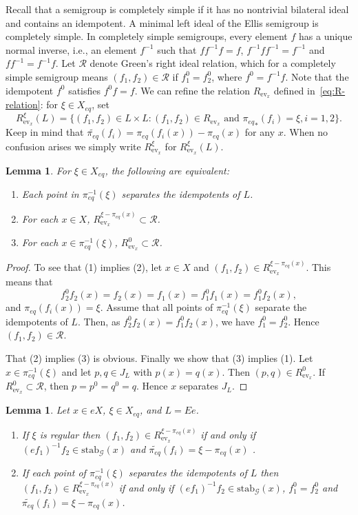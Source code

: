 \documentclass[12pt]{amsart}
\newtheorem{lemma}[theorem]{Lemma}
\theoremstyle{definition}
\numberwithin{equation}{section}
\newcommand{\tcb}{\textcolor{blue}}
\newcommand{\Gg}{{\mathcal G}}
\newcommand{\Rr}{{\mathcal R}}
\newcommand{\Xe}{X_{eq}}
\newcommand{\pe}{\pi_{eq}}
\newcommand{\fb}[1]{\pe^{-1}(#1)}
\newcommand{\tpe}{\widetilde{\pe}}
\newcommand{\ev}{\mathrm{ev}}
\newcommand{\stab}{\mathrm{stab}}
\begin{document}
 Recall that a semigroup is  completely simple  if it has no nontrivial bilateral ideal and contains an idempotent. A minimal left ideal of the Ellis semigroup is completely simple. In completely simple semigroups, every element $f$ has a unique normal inverse, i.e., an element $f^{-1}$ such that $ff^{-1}f = f$, $f^{-1}ff^{-1} = f^{-1}$ and $ff^{-1}=f^{-1}f$. 
Let $\Rr$ denote Green's right ideal relation, which for a completely simple semigroup means $(f_1,f_2)\in \Rr$ if $f_1^0 = f_2^0$, where 
$f^0 = f^{-1} f$. Note that the idempotent  $f^0$   satisfies $f^0f=f$. We can refine the relation $R_{\ev_x}$ defined in~\eqref{eq:R-relation}: for $\xi\in\Xe$, set
$$R^\xi_{\ev_x}(L)=\{(f_1,f_2)\in L\times L: (f_1,f_2)\in R_{\ev_x} \mbox{ and } {\pe}_* (f_i)= \xi, i=1,2\}.$$ 
Keep in mind that $\tpe (f_i)= \pe(f_i(x)) -\pe(x)$  for any $x$. 
When no confusion  arises we simply write $R^\xi_{\ev_x}$ for $R^\xi_{\ev_x}(L)$.
\begin{lemma}\label{lem-Rr} For $\xi\in\Xe$, the following are equivalent:
\begin{enumerate}
\item Each point in $\fb{\xi}$ separates the idempotents of $L$.
\item For each $x\in X$, $R^{\xi-\pe(x)}_{\ev_x}\subset \Rr$. 
\item For each $x\in \fb{\xi}$, $R^0_{\ev_x}\subset \Rr$. 
\end{enumerate}
\end{lemma}
\begin{proof} To see that (1) implies (2),  
let $x\in X$ and $(f_1,f_2)\in R^{\xi-\pe(x)}_{\ev_x}$. This means that \[f_2^0 f_2(x)= f_2(x)=f_1(x)=f_1^0 f_1(x) = f_1^0 f_2(x) , \] and $\pe(f_i(x))=\xi$. Assume that all points of $\fb{\xi}$ separate the idempotents of $L$. Then, as $f_2^0 f_2(x)=  f_1^0 f_2(x)$, we have $f_1^0 = f_2^0$. Hence $(f_1,f_2)\in\Rr$.

That (2) implies (3) is  obvious. 
Finally we show that (3) implies (1). Let  $x\in\fb{\xi}$ and 
let $p,q\in J_L$ with $p(x)=q(x)$. Then $(p,q)\in R^0_{\ev_x}$. If $R^0_{\ev_x}\subset \Rr$, then $p=p^0=q^0=q$. Hence $x$ separates $J_L$.
\end{proof}
\begin{lemma} \label{lem-sing}
Let $x\in eX$, $\xi\in \Xe$, and $L=Ee$.
\begin{enumerate}
\item If  $\xi$ is regular then
$(f_1,f_2)\in R^{\xi-\pe(x)}_{\ev_{x}}$ if and only if $(ef_1)^{-1}f_2 \in \stab_{\Gg}(x)$ and $\tpe(f_i) = \xi-\pe(x)$     . 
\item  
If each point of $\fb{\xi}$ separates the idempotents of $L$ then
$(f_1,f_2)\in R^{\xi-\pe(x)}_{\ev_{x}}$ if and only if $(ef_1)^{-1}f_2 \in \stab_{\Gg}(x)$, $f_1^0=f_2^0$ and $\tpe(f_i) = \xi-\pe(x)$. 
\end{enumerate}
\end{lemma}
\end{document}
